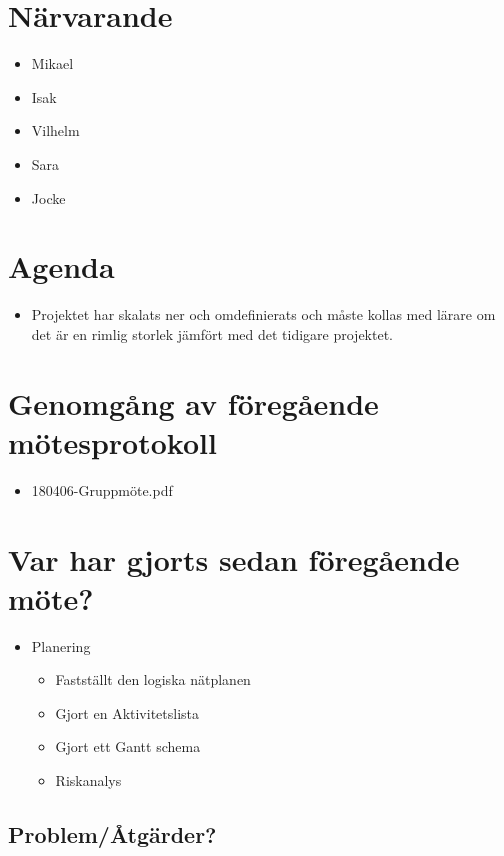
\section*{Närvarande}
\begin{itemize}[noitemsep]
    \item Mikael
    \item Isak
    \item Vilhelm
    \item Sara
    \item Jocke
\end{itemize}

\section*{Agenda}
\begin{itemize}
	\item Projektet har skalats ner och omdefinierats och måste kollas med lärare om det är en rimlig storlek jämfört med det tidigare projektet.
\end{itemize}

\section*{Genomgång av föregående mötesprotokoll}
\begin{itemize}[noitemsep]
    \item 180406-Gruppmöte.pdf
\end{itemize}

\section*{Var har gjorts sedan föregående möte?}
\begin{itemize}[noitemsep]
    \item Planering
    \begin{itemize}[noitemsep]
        \item Fastställt den logiska nätplanen
        \item Gjort en Aktivitetslista
        \item Gjort ett Gantt schema
        \item Riskanalys
    \end{itemize}
\end{itemize}

\subsection*{Problem/Åtgärder?}

